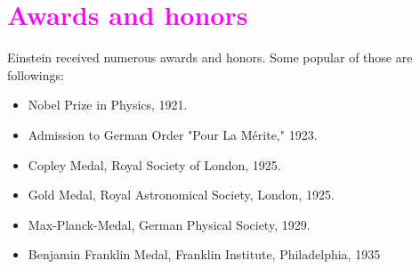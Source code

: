 \documentclass{article}
\begin{document}
\section{\textcolor{magenta}{Awards and honors}}
Einstein received numerous awards and honors. Some popular of those are followings:

\begin{itemize}
    \item Nobel Prize in Physics, 1921. 
    \item Admission to German Order "Pour La Mérite," 1923. 
    \item Copley Medal, Royal Society of London, 1925. 
    \item Gold Medal, Royal Astronomical Society, London, 1925. 
    \item Max-Planck-Medal, German Physical Society, 1929. 
    \item Benjamin Franklin Medal, Franklin Institute, Philadelphia, 1935
\end{itemize}
\end{document}
